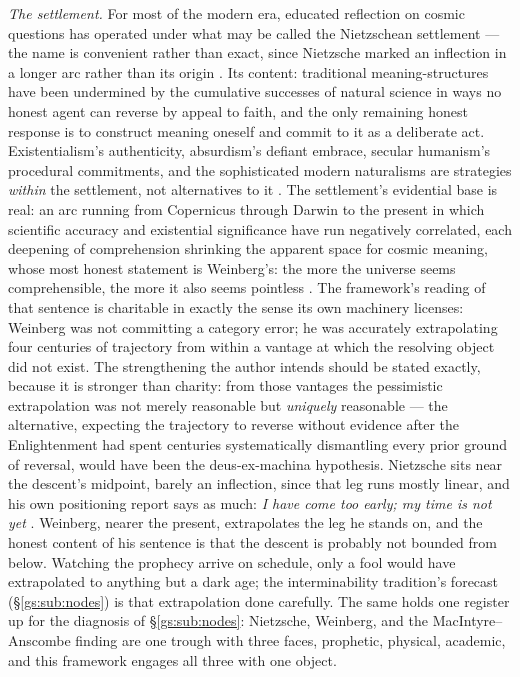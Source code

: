 \documentclass[11pt]{article}
\numberwithin{equation}{section}
\theoremstyle{plain}
\theoremstyle{definition}
\theoremstyle{remark}
\begin{document}
\emph{The settlement.} For most of the modern era, educated
reflection on cosmic questions has operated under what may be called
the Nietzschean settlement --- the name is convenient rather than
exact, since Nietzsche marked an inflection in a longer arc rather
than its origin \cite{nietzsche1974gay}. Its content: traditional
meaning-structures have been undermined by the cumulative successes
of natural science in ways no honest agent can reverse by appeal to
faith, and the only remaining honest response is to construct meaning
oneself and commit to it as a deliberate act. Existentialism's
authenticity, absurdism's defiant embrace, secular humanism's
procedural commitments, and the sophisticated modern naturalisms are
strategies \emph{within} the settlement, not alternatives to it
\cite{Camus42, Sartre46, Carroll16}. The settlement's evidential
base is real: an arc running from Copernicus through Darwin to the
present in which scientific accuracy and existential significance
have run negatively correlated, each deepening of comprehension
shrinking the apparent space for cosmic meaning, whose most honest
statement is Weinberg's: the more the universe seems comprehensible,
the more it also seems pointless \cite{weinberg1977first}. The
framework's reading of that sentence is charitable in exactly the
sense its own machinery licenses: Weinberg was not committing a
category error; he was accurately extrapolating four centuries of
trajectory from within a vantage at which the resolving object did
not exist. The strengthening the author intends should be
stated exactly, because it is stronger than charity: from those
vantages the pessimistic extrapolation was not merely reasonable but
\emph{uniquely} reasonable --- the alternative, expecting the
trajectory to reverse without evidence after the Enlightenment had
spent centuries systematically dismantling every prior ground of
reversal, would have been the deus-ex-machina hypothesis. Nietzsche
sits near the descent's midpoint, barely an inflection, since that
leg runs mostly linear, and his own positioning report says as
much: \emph{I have come too early; my time is not yet}
\cite{nietzsche1974gay}. Weinberg, nearer the present, extrapolates
the leg he stands on, and the honest content of his sentence is that
the descent is probably not bounded from below. Watching the prophecy
arrive on schedule, only a fool would have extrapolated to anything
but a dark age; the interminability tradition's forecast
(\S\ref{gs:sub:nodes}) is that extrapolation done carefully. The same holds one register up for the diagnosis of
\S\ref{gs:sub:nodes}: Nietzsche, Weinberg, and the
MacIntyre--Anscombe finding are one trough with three faces, prophetic, physical, academic, and this framework engages all
three with one object.
\end{document}
